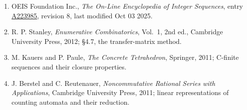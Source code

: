 \documentclass[11pt]{article}
\theoremstyle{definition}
\begin{document}
\begin{enumerate}

\item OEIS Foundation Inc., \emph{The On-Line Encyclopedia of Integer Sequences}, entry \href{https://oeis.org/A223985}{A223985}, revision 8, last modified Oct 03 2025.

\item R. P. Stanley, \emph{Enumerative Combinatorics}, Vol.~1, 2nd ed., Cambridge University Press, 2012; \S4.7, the transfer-matrix method.

\item M. Kauers and P. Paule, \emph{The Concrete Tetrahedron}, Springer, 2011; C-finite sequences and their closure properties.

\item J. Berstel and C. Reutenauer, \emph{Noncommutative Rational Series with Applications}, Cambridge University Press, 2011; linear representations of counting automata and their reduction.

\end{enumerate}
\end{document}
